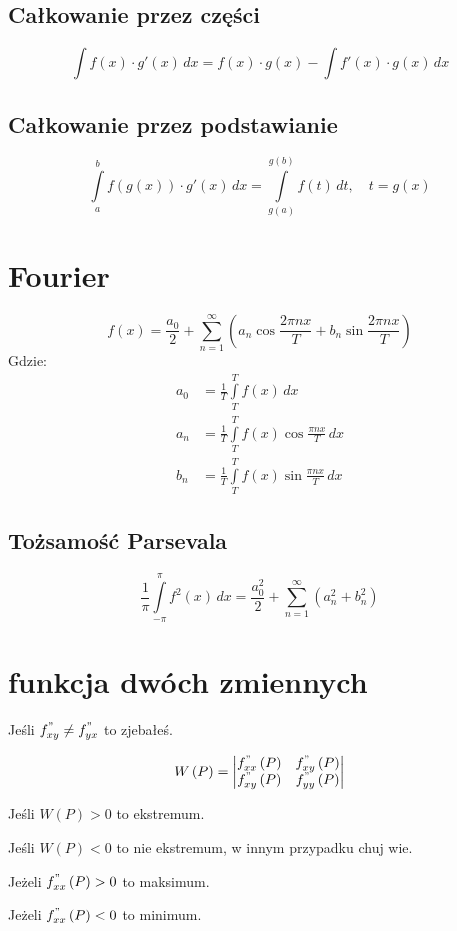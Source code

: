 \documentclass[a4paper,12pt]{article}
\begin{document}
\begin{multicols}{2}
    \subsection*{Całkowanie przez części}
    \[
        \int f\left( x \right) \cdot g' \left( x \right)\, dx = f\left( x \right)\cdot g\left( x \right) - \int f' \left( x \right) \cdot g\left( x \right)\, dx
    \]

    \subsection*{Całkowanie przez podstawianie}
    \[
        \int \limits^b_a f\left(g \left(x\right)\right) \cdot g' \left(x\right)\, dx = \int \limits^{g\left(b\right)}_{g\left(a\right)} f \left(t\right)\, dt,\quad t = g \left(x\right)
    \]
    \section{Fourier}
    \[
        f\left(x\right) = \frac{a_0}{2} + \sum \limits^\infty_{n = 1} \left( a_n \cos \frac{2\pi nx}{T} + b_n \sin \frac{2\pi nx}{T} \right)
    \]
    Gdzie:
    \begin{align*}
        a_0 &= \frac{1}{T} \int \limits^T_T f \left( x \right)\, dx \\
        a_n &= \frac{1}{T} \int \limits^T_T f \left( x \right) \cos \frac{\pi n x}{T}\, dx \\
        b_n &= \frac{1}{T} \int \limits^T_T f \left( x \right) \sin \frac{\pi n x}{T}\, dx
    \end{align*}

    \subsection*{Tożsamość Parsevala}
    \[
        \frac{1}{\pi}\int \limits^\pi_{ -\pi} f^2 \left(x\right)\, dx = \frac{a_0^2}{2} + \sum \limits^\infty_{n = 1} \left( a^2_n + b^2_n \right)
    \]

    \section{funkcja dwóch zmiennych}
    Jeśli $f^"_{xy} \not = f^"_{yx}$ to zjebałeś.

    \[
        W\left(P\right) = \left|
        \begin{matrix}
            f^"_{x x}\left(P\right) & f^"_{x y}\left(P\right) \\
            f^"_{x y}\left(P\right) & f^"_{y y}\left(P\right)
        \end{matrix}\right|
    \]

    Jeśli $W\left(P\right) > 0$ to ekstremum.

    Jeśli $W\left(P\right) < 0$ to nie ekstremum, w innym przypadku chuj wie.

    Jeżeli $f^"_{x x}\left(P\right) > 0$ to maksimum.

    Jeżeli $f^"_{x x}\left(P\right) < 0$ to minimum.
\end{multicols}
\end{document}
